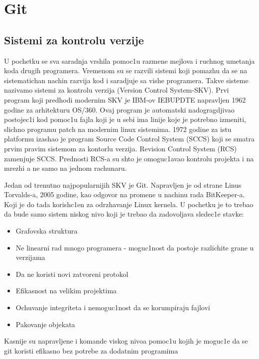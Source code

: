 \documentclass[a4paper,fleqn,12pt]{JMThesis}
\newcommand{\latin}{\fontencoding{T1}\selectfont}
\theoremstyle{plain}
\theoremstyle{definition}
\begin{document}
\chapter[Git]{Git}
\bigskip

\section{Sistemi za kontrolu verzije}

U pochetku se sva saradnja vrshila pomoc1u razmene mejlova i ruchnog umetanja koda drugih programera. 
Vremenom su se razvili sistemi koji pomazhu da se na sistematichan nachin razvija kod i saradjuje sa vishe programera. 
Takve sisteme nazivamo sistemi za kontrolu verzija ({\latin Version Control System}-SKV). 
Prvi program koji predhodi modernim SKV je IBM-ov {\latin IEBUPDTE} napravljen 1962 godine za arhitekturu {\latin OS/360}.
Ovaj program je automat\-ski nadogragdjivao postojec1i kod pomoc1u fajla koji je u sebi ima linije koje je potrebno izmeniti, slichno programu {\latin patch} na modernim {\latin linux} sistemima. 
1972 godine za istu platformu izashao je program {\latin Source Code Control System (SCCS)} koji se smatra prvim pravim sistemom za kontorlu verzija. 
{\latin Revision Control System (RCS)} zamenjuje {\latin SCCS}. 
Prednosti {\latin RCS}-a su shto je omoguc1avao kontrolu projekta i na mrezhi a ne samo na jednom rachunaru. \par 

Jedan od trenutno najpopularnijih SKV je Git. 
Napravljen je od strane Linus Torvalds-a, 2005 godine, kao odgovor na promene u nachinu rada {\latin BitKeeper}-a.
Koji je do tada korish\-c1en za odrzhavanje {\latin Linux} kernela.
U pochetku je to trebao da bude samo sistem niskog nivo koji je trebao da zadovoljava sledec1e stavke:
\begin{itemize}
    \item Grafovska struktura
    \item Ne linearni rad mnogo programera - moguc1nost da postoje razlichite grane u verzijama
    \item Da ne koristi novi zatvoreni protokol
    \item Efikasnost na velikim projektima
    \item Ochuvanje integriteta i nemoguc1nost da se korumpiraju fajlovi
    \item Pakovanje objekata
\end{itemize}

Kasnije su napravljene i komande viskog nivoa pomoc1u kojih je moguc1e da se git koristi efikasno bez potrebe za dodatnim programima
\end{document}

